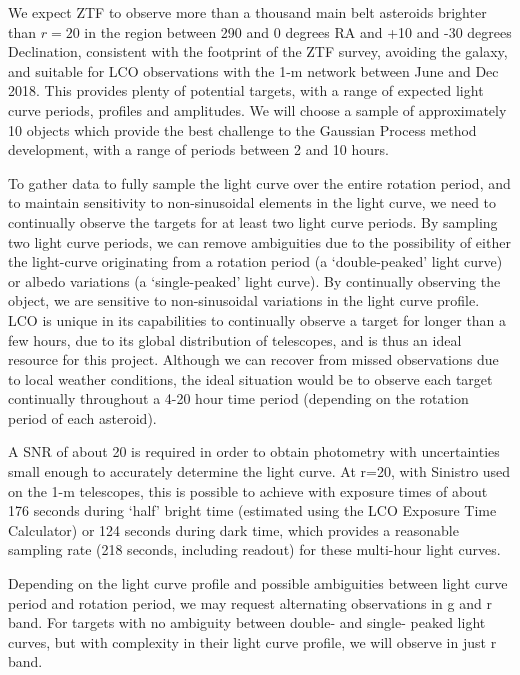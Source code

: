 \documentclass[11pt]{article}
\begin{document}
We expect ZTF to observe more than a thousand main belt asteroids
brighter than $r=20$ in the region between 290 and 0 degrees RA and 
+10 and -30 degrees Declination, consistent with the footprint of the
ZTF survey, avoiding the galaxy, and suitable for LCO observations with
the 1-m network between June and Dec 2018. This provides plenty of
potential targets, with a range of expected light curve periods,
profiles and amplitudes. We will choose a sample of approximately 10
objects which provide the best challenge to the Gaussian Process method
development, with a range of periods between 2 and 10 hours. 

To gather data to fully sample the light curve over the entire rotation
period, and to maintain sensitivity to non-sinusoidal elements in the
light curve, we need to continually observe the targets for at least
two light curve periods. By sampling two light curve periods, we can
remove ambiguities due to the possibility of either the light-curve
originating from a rotation period (a `double-peaked' light curve) or
albedo variations (a `single-peaked' light curve).  By continually
observing the object, we are sensitive to non-sinusoidal variations in
the light curve profile. LCO is unique in its capabilities to
continually observe a target for longer than a few hours, due to its
global distribution of telescopes, and is thus an ideal resource for
this project. Although we can recover from missed observations due to
local weather conditions, the ideal situation would be to observe each
target continually throughout a 4-20 hour time period (depending on the
rotation period of each asteroid). 

A SNR of about 20 is required in order to obtain photometry with
uncertainties small enough to accurately determine the light curve. At
r=20, with Sinistro used on the 1-m telescopes, this is possible to
achieve with exposure times of about 176 seconds during `half' bright
time (estimated using the LCO Exposure Time Calculator) or 124 seconds
during dark time, which provides a reasonable sampling rate (218
seconds, including readout) for these multi-hour light curves. 

Depending on the light curve profile and possible ambiguities between
light curve period and rotation period, we may request alternating
observations in g and r band. For targets with no ambiguity between
double- and single- peaked light curves, but with complexity in their
light curve profile, we will observe in just r band.


% 
\end{document}
